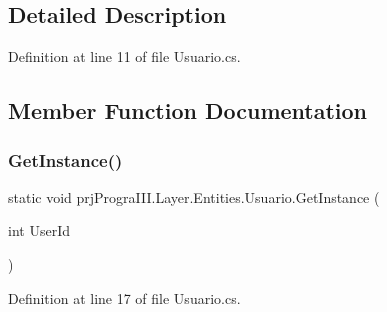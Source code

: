 \subsection{Detailed Description}


Definition at line 11 of file Usuario.\+cs.



\subsection{Member Function Documentation}
\hypertarget{classprj_progra_i_i_i_1_1_layer_1_1_entities_1_1_usuario_a54df50298c6cc60b0b8a6843f5c88d83}{}\label{classprj_progra_i_i_i_1_1_layer_1_1_entities_1_1_usuario_a54df50298c6cc60b0b8a6843f5c88d83} 
\subsubsection{\texorpdfstring{Get\+Instance()}{GetInstance()}}
{\footnotesize\ttfamily static void prj\+Progra\+I\+I\+I.\+Layer.\+Entities.\+Usuario.\+Get\+Instance (\begin{DoxyParamCaption}\item[{int}]{User\+Id }\end{DoxyParamCaption})\hspace{0.3cm}{\ttfamily [static]}}



Definition at line 17 of file Usuario.\+cs.

